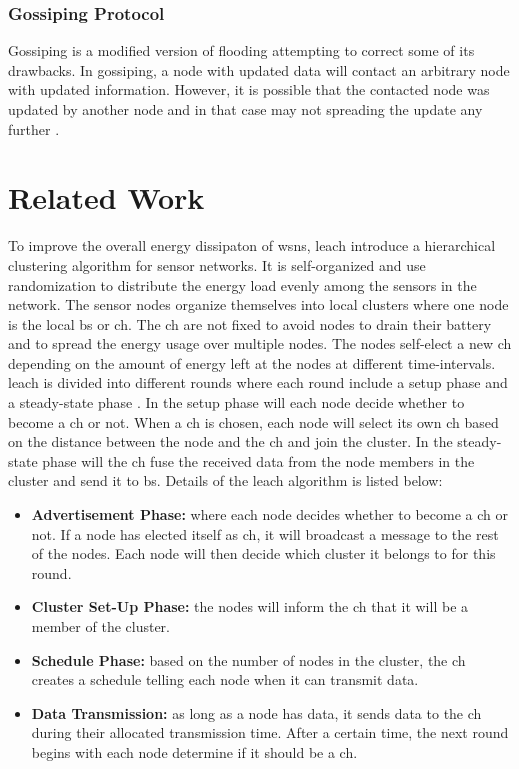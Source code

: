 \documentclass[USenglish]{uit-thesis}
\begin{document}
\subsection{Gossiping Protocol}
Gossiping is a modified version of flooding attempting to correct some of its drawbacks. In gossiping, a node with updated data will contact an arbitrary node with updated information. However, it is possible that the contacted node was updated by another node and in that case may not spreading the update any further \cite{dsbook}.


\chapter{Related Work} \label{chap:related_work}
\glsresetall
To improve the overall energy dissipaton of \glspl{wsn}, \gls{leach} \cite{leach} introduce a hierarchical clustering algorithm for sensor networks. It is self-organized and use randomization to distribute the energy load evenly among the sensors in the network. The sensor nodes organize themselves into local clusters where one node is the local \gls{bs} or \gls{ch}. The \gls{ch} are not fixed to avoid nodes to drain their battery and to spread the energy usage over multiple nodes. The nodes self-elect a new \gls{ch} depending on the amount of energy left at the nodes at different time-intervals. \gls{leach} is divided into different rounds where each round include a setup phase and a steady-state phase \cite{tree_based}. In the setup phase will each node decide whether to become a \gls{ch} or not. When a \gls{ch} is chosen, each node will select its own \gls{ch} based on the distance between the node and the \gls{ch} and join the cluster. In the steady-state phase will the \gls{ch} fuse the received data from the node members in the cluster and send it to \gls{bs}. Details of the \gls{leach} algorithm is listed below:

\begin{itemize}
\item \textbf{Advertisement Phase:} where each node decides whether to become a \gls{ch} or not. If a node has elected itself as \gls{ch}, it will broadcast a message to the rest of the nodes. Each node will then decide which cluster it belongs to for this round.
\item \textbf{Cluster Set-Up Phase:} the nodes will inform the \gls{ch} that it will be a member of the cluster.
\item \textbf{Schedule Phase:} based on the number of nodes in the cluster, the \gls{ch} creates a schedule telling each node when it can transmit data.
\item \textbf{Data Transmission:} as long as a node has data, it sends data to the \gls{ch} during their allocated transmission time. After a certain time, the next round begins with each node determine if it should be a \gls{ch}. 
\end{itemize}
\end{document}
